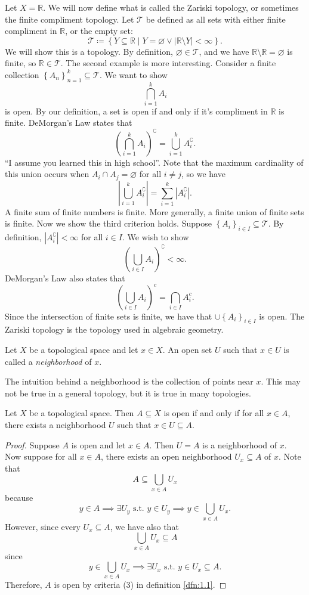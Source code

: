 Let $X=\mathbb{R}$. We will now define what is called the Zariski topology, or sometimes the finite compliment topology. Let $\mathcal{T} $ be defined as all sets with either finite compliment in $\mathbb{R}$, or the empty set:
\[
	\mathcal{T} \coloneqq \left\{ Y\subseteq \mathbb{R}\mid Y=\varnothing \lor \left| \mathbb{R}\setminus Y \right| <\infty \right\}
.\]
We will show this is a topology. By definition, $\varnothing\in \mathcal{T} $, and we have $\mathbb{R}\setminus\mathbb{R}=\varnothing $ is finite, so $\mathbb{R}\in \mathcal{T} $. The second example is more interesting. Consider a finite collection $\left\{ A_n \right\}_{n=1}^k \subseteq \mathcal{T} $. We want to show
\[
	\bigcap_{i=1}^{k} A_i
\]
is open. By our definition, a set is open if and only if it's compliment in $\mathbb{R}$ is finite. DeMorgan's Law states that
\[
	\left( \bigcap_{i=1}^{k} A_i \right)^\complement = \bigcup_{i=1}^{k} A_i^\complement
.\]
``I assume you learned this in high school''. Note that the maximum cardinality of this union occurs when $A_i \cap A_j = \varnothing$ for all $i\neq j$, so we have
\[
	\left| \bigcup_{i=1}^{k} A_i^\complement \right| =\sum_{i=1}^{k} \left| A_i^\complement \right|
.\]
A finite sum of finite numbers is finite. More generally, a finite union of finite sets is finite. Now we show the third criterion holds. Suppose $\left\{ A_i \right\}_{i\in I}\subseteq \mathcal{T} $. By definition, $\left| A_i^\complement \right| <\infty$ for all $i\in I$. We wish to show
\[
	\left(\bigcup_{i\in I} A_i\right)^\complement < \infty
.\]
DeMorgan's Law also states that
\[
	\left( \bigcup_{i\in I} A_i  \right)^{c} = \bigcap_{i\in I} A_i^{c} 
.\]
Since the intersection of finite sets is finite, we have that $\cup \left\{ A_i \right\}_{i\in I}$ is open. The Zariski topology is the topology used in algebraic geometry.
\begin{definition}[Neighborhood]\label{dfn:1.3}
	Let $X$ be a topological space and let $x\in X$. An open set $U$ such that $x\in U$ is called a \emph{neighborhood} of $x$.
\end{definition}

The intuition behind a neighborhood is the collection of points near $x$. This may not be true in a general topology, but it is true in many topologies.

\begin{theorem}\label{thm:1.1}
	Let $X$ be a topological space. Then $A\subseteq X$ is open if and only if for all $x\in A$, there exists a neighborhood $U$ such that $x\in U\subseteq A$.
\end{theorem}
\begin{proof}
	Suppose $A$ is open and let $x\in A$. Then $U=A$ is a neighborhood of $x$. Now suppose for all $x\in A$, there exists an open neighborhood $U_x\subseteq A$ of $x$. Note that
	\[
		A\subseteq \bigcup_{x\in A} U_x 
	\]
	because
	\[
		y\in A \implies  \exists U_y\text{ s.t. }y\in U_y \implies  y\in \bigcup_{x\in A} U_x
	.\]
	However, since every $U_x\subseteq A$, we have also that
	\[
		\bigcup_{x\in A} U_x \subseteq A
	\]
	since
	\[
		y\in \bigcup_{x\in A} U_x \implies \exists U_x \text{ s.t. }y\in U_x \subseteq A 
	.\]
	Therefore, $A$ is open by criteria (3) in definition \ref{dfn:1.1}.
\end{proof}
